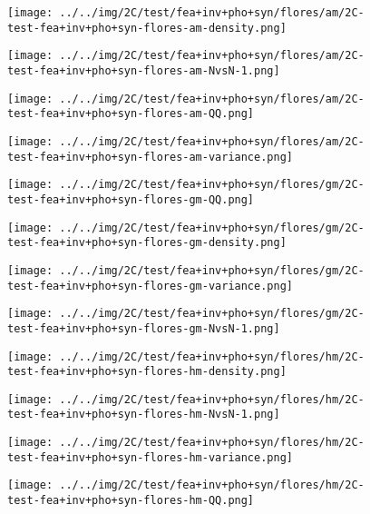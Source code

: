 \begin{figure}[H]
\centering	\texttt{[image: ../../img/2C/test/fea+inv+pho+syn/flores/am/2C-test-fea+inv+pho+syn-flores-am-density.png]}
\end{figure}
\begin{figure}[H]
\centering	\texttt{[image: ../../img/2C/test/fea+inv+pho+syn/flores/am/2C-test-fea+inv+pho+syn-flores-am-NvsN-1.png]}
\end{figure}
\begin{figure}[H]
\centering	\texttt{[image: ../../img/2C/test/fea+inv+pho+syn/flores/am/2C-test-fea+inv+pho+syn-flores-am-QQ.png]}
\end{figure}
\begin{figure}[H]
\centering	\texttt{[image: ../../img/2C/test/fea+inv+pho+syn/flores/am/2C-test-fea+inv+pho+syn-flores-am-variance.png]}
\end{figure}
\begin{figure}[H]
\centering	\texttt{[image: ../../img/2C/test/fea+inv+pho+syn/flores/gm/2C-test-fea+inv+pho+syn-flores-gm-QQ.png]}
\end{figure}
\begin{figure}[H]
\centering	\texttt{[image: ../../img/2C/test/fea+inv+pho+syn/flores/gm/2C-test-fea+inv+pho+syn-flores-gm-density.png]}
\end{figure}
\begin{figure}[H]
\centering	\texttt{[image: ../../img/2C/test/fea+inv+pho+syn/flores/gm/2C-test-fea+inv+pho+syn-flores-gm-variance.png]}
\end{figure}
\begin{figure}[H]
\centering	\texttt{[image: ../../img/2C/test/fea+inv+pho+syn/flores/gm/2C-test-fea+inv+pho+syn-flores-gm-NvsN-1.png]}
\end{figure}
\begin{figure}[H]
\centering	\texttt{[image: ../../img/2C/test/fea+inv+pho+syn/flores/hm/2C-test-fea+inv+pho+syn-flores-hm-density.png]}
\end{figure}
\begin{figure}[H]
\centering	\texttt{[image: ../../img/2C/test/fea+inv+pho+syn/flores/hm/2C-test-fea+inv+pho+syn-flores-hm-NvsN-1.png]}
\end{figure}
\begin{figure}[H]
\centering	\texttt{[image: ../../img/2C/test/fea+inv+pho+syn/flores/hm/2C-test-fea+inv+pho+syn-flores-hm-variance.png]}
\end{figure}
\begin{figure}[H]
\centering	\texttt{[image: ../../img/2C/test/fea+inv+pho+syn/flores/hm/2C-test-fea+inv+pho+syn-flores-hm-QQ.png]}
\end{figure}
